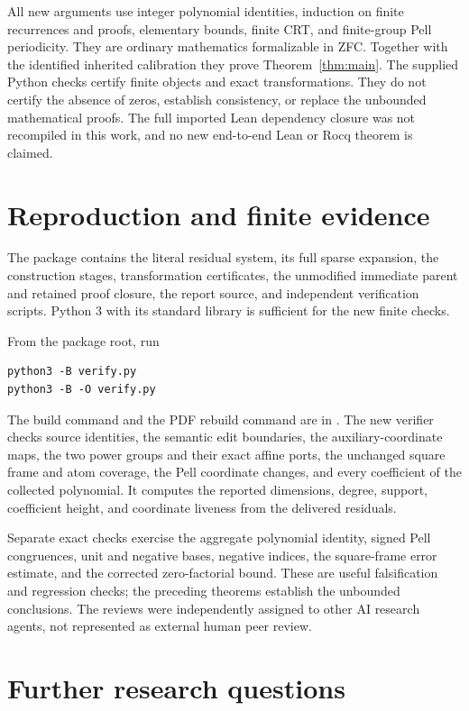 \documentclass[11pt,letterpaper]{article}
\theoremstyle{definition}\newtheorem{definition}[theorem]{Definition}
\theoremstyle{remark}\newtheorem{remark}[theorem]{Remark}
\begin{document}
All new arguments use integer polynomial identities, induction on finite
recurrences and proofs, elementary bounds, finite CRT, and finite-group
Pell periodicity. They are ordinary mathematics formalizable in ZFC.
Together with the identified inherited calibration they prove
Theorem~\ref{thm:main}. The supplied Python checks certify finite objects
and exact transformations. They do not certify the absence of zeros,
establish consistency, or replace the unbounded mathematical proofs.
The full imported Lean dependency closure was not recompiled in this
work, and no new end-to-end Lean or Rocq theorem is claimed.

\section{Reproduction and finite evidence}

The package contains the literal residual system, its full sparse
expansion, the construction stages, transformation certificates, the
unmodified immediate parent and retained proof closure, the report source,
and independent verification scripts. Python 3 with its standard library
is sufficient for the new finite checks.

From the package root, run
\begin{verbatim}
python3 -B verify.py
python3 -B -O verify.py
\end{verbatim}
The build command and the PDF rebuild command are in .
The new verifier checks source identities, the semantic edit boundaries,
the auxiliary-coordinate maps, the two power groups and their exact
affine ports, the unchanged square frame and atom coverage, the Pell
coordinate changes, and every coefficient of the collected polynomial.
It computes the reported dimensions, degree, support, coefficient height,
and coordinate liveness from the delivered residuals.

Separate exact checks exercise the aggregate polynomial identity, signed
Pell congruences, unit and negative bases, negative indices, the square-frame
error estimate, and the corrected zero-factorial bound. These are useful
falsification and regression checks; the preceding theorems establish the
unbounded conclusions. The reviews were independently assigned to other
AI research agents, not represented as external human peer review.

\section{Further research questions}
\end{document}
